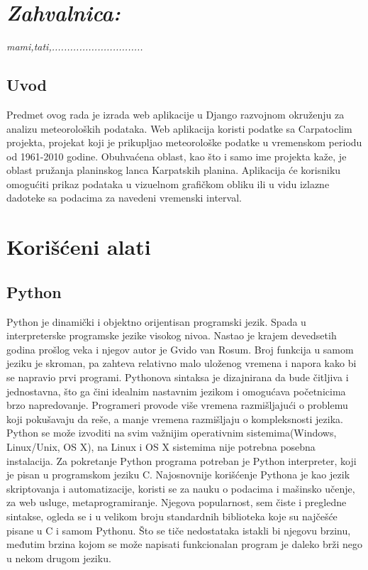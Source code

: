 \documentclass[12pt]{article}
\begin{document}
\section*{\textsl{Zahvalnica:}}
\textsl{mami,tati,..............................}
\newpage
\begin{center}
\section*{Uvod}
\end{center}
Predmet ovog rada je izrada web aplikacije u Django razvojnom okruženju za analizu meteoroloških podataka.  Web aplikacija koristi podatke sa Carpatoclim projekta, projekat koji je prikupljao meteorološke podatke u vremenskom periodu od 1961-2010 godine. Obuhvaćena oblast, kao što i samo ime projekta kaže, je oblast  pružanja planinskog lanca Karpatskih planina.  Aplikacija će korisniku omogućiti prikaz podataka u vizuelnom grafičkom obliku ili u vidu izlazne dadoteke sa podacima za  navedeni vremenski interval.
\newpage

\section{Korišćeni alati}

\subsection{Python} 

Python je dinamički i objektno orijentisan programski jezik. Spada u interpreterske programske jezike visokog nivoa. Nastao je krajem devedsetih godina prošlog veka i njegov autor je Gvido van Rosum.  Broj funkcija u samom jeziku je skroman, pa zahteva relativno malo uloženog vremena i napora kako bi se napravio prvi programi. Pythonova sintaksa je dizajnirana da bude čitljiva i jednostavna, što ga čini idealnim nastavnim jezikom i omogućava početnicima brzo napredovanje. Programeri provode više vremena razmišljajući o problemu koji pokušavaju da reše, a manje vremena razmišljaju o kompleksnosti jezika. Python se može izvoditi na svim važnijim operativnim sistemima(Windows, Linux/Unix, OS X), na Linux i OS X sistemima nije potrebna posebna instalacija. Za pokretanje Python programa potreban je Python interpreter, koji je pisan u programskom jeziku C. 
Najosnovnije korišćenje Pythona je kao jezik skriptovanja i automatizacije, koristi se za nauku o podacima i mašinsko učenje, za web usluge, metaprogramiranje. Njegova popularnost, sem čiste i pregledne sintakse, ogleda se i u velikom broju standardnih biblioteka koje su najčešće pisane u C i samom Pythonu.  Što se tiče nedostataka istakli bi njegovu brzinu, međutim brzina kojom se može napisati funkcionalan program je daleko brži nego u nekom drugom jeziku.  
\end{document}
